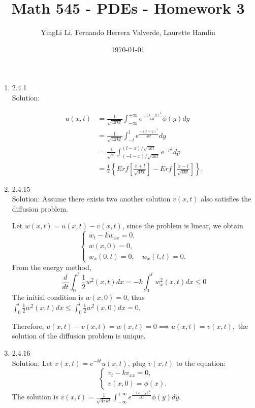 \documentclass[12pt]{article}%
\begin{document}
\title{Math 545 - PDEs - Homework 3}
\author{YingLi Li, Fernando Herrera Valverde, Laurette Hamlin}
\date{\today}
\maketitle

\begin{enumerate}
    \item 2.4.1 \\
    Solution: 

  \[ 
    \begin{aligned}
        u(x, t) & =\frac{1}{\sqrt{4 \pi k t}} \int_{-\infty}^{+\infty} e^\frac{-(x-y)^{2}}{4kt}\phi(y) d y\\
        & =\frac{1}{\sqrt{4 \pi kt}} \int_{-l}^{l} e^\frac{-(x-y)^{2}}{4kt}  d y\\
        & =\frac{1}{\sqrt{\pi}} \int_{(-l-x) / \sqrt{4 k t}}^{(l-x) / \sqrt{4 k t}} e^{-p^{2}} d p \\
        & =\frac{1}{2}\left\{ E r f\left[\frac{x+l}{\sqrt{4 k t}}\right]-E r f\left[\frac{x-l}{\sqrt{4 k t}}\right]\right\} .
        \end{aligned} 
\]

    \item 2.4.15 \\
    Solution: Assume there exists two another solution $v(x,t)$ also satisfies the diffusion problem.

    Let $w(x,t)=u(x,t)-v(x,t)$, since the problem is linear, we obtain 
    \begin{equation*}
        \begin{cases}
            w_{t}-kw_{xx}=0,
            \\
            w(x,0)=0,
            \\
            w_{x}(0,t)=0,\quad w_{x}(l,t)=0.
        \end{cases} 
    \end{equation*}
 From the energy method, 
 \[\frac{d}{d t} \int_{0}^{l} \frac{1}{2} w^{2}(x, t) d x=-k \int_{0}^{l} w_{x}^{2}(x, t) d x \leq 0\]
 The initial condition is $w(x,0)=0$, thus $ \int_{0}^{l} \frac{1}{2} w^{2}(x, t) d x \leq  \int_{0}^{l} \frac{1}{2} w^{2}(x, 0) dx =0.$
 
 Therefore, $u(x,t)-v(x,t)=w(x,t)=0 \implies u(x,t)=v(x,t),$ the solution of the diffusion problem is unique.

 \item 2.4.16 \\
 Solution: Let $v(x,t)=e^{-bt}u(x,t)$, plug $v(x,t)$ to the equation:
 \begin{equation*}
    \begin{cases}
        v_{t}-kv_{xx}=0,
        \\
        v(x,0)=\phi(x).
    \end{cases} 
 \end{equation*}
 The solution is $v(x, t) =\frac{1}{\sqrt{4 \pi k t}} \int_{-\infty}^{+\infty} e^\frac{-(x-y)^{2}}{4kt}\phi(y) dy$.


\end{enumerate}
\end{document}
